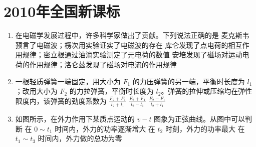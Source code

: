 \documentclass[\gkver]{gaokaozhenti}
\begin{document}
\chapter{2010年全国新课标}

\begin{enumerate}
\item
在电磁学发展过程中，许多科学家做出了贡献。下列说法正确的是
{麦克斯韦预言了电磁波；楞次用实验证实了电磁波的存在}
{库仑发现了点电荷的相互作用规律；密立根通过油滴实验测定了元电荷的数值}
{安培发现了磁场对运动电荷的作用规律；洛仑兹发现了磁场对电流的作用规律}

\item
一根轻质弹簧一端固定，用大小为 $F_{1}$ 的力压弹簧的另一端，平衡时长度为 $l_{1}$；改用大小为 $F_{2}$ 的力拉弹簧，平衡时长度为 $l_{2}$。弹簧的拉伸或压缩均在弹性限度内，该弹簧的劲度系数为
{$\frac{F_{2}+F_{1}}{l_{2}+l_{1}}$}
{$\frac{F_{2}+F_{1}}{l_{2}-l_{1}}$}
{$\frac{F_{2}-F_{1}}{l_{2}+l_{1}}$}

\item
如图所示，在外力作用下某质点运动的 $v-t$ 图象为正弦曲线。从图中可以判断
{在 $0\sim t_{1}$ 时间内，外力的功率逐渐增大}
{在 $t_{2}$ 时刻，外力的功率最大}
{在 $t_{1}\sim t_{3}$ 时间内，外力做的总功为零}


\end{enumerate}
\end{document}
